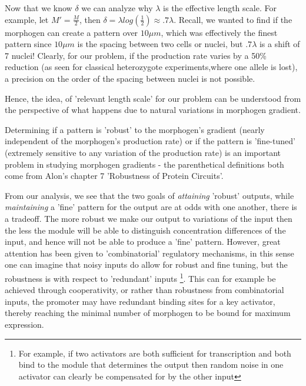   Now that we know $\delta$ we can analyze why $\lambda$ is the effective length scale.  For example, let $M' = \frac{M}{2}$, then $\delta = \lambda log(\frac{1}{2}) \approx .7 \lambda $.  Recall, we wanted to find if the morphogen can create a pattern over $10 \mu m$, which was effectively the finest pattern since  $10 \mu m$ is the spacing between two cells or nuclei, but $.7 \lambda $ is a shift of 7 nuclei!  Clearly, for our problem, if the production rate varies by a 50\% reduction (as seen for classical heterozygote experiments,where one allele is lost), a precision on the order of the spacing between nuclei is not possible.


    Hence, the idea, of 'relevant length scale' for our problem can be understood from the perspective of what happens due to natural variations in morphogen gradient.

\par
Determining if a pattern is 'robust' to the morphogen's gradient (nearly independent of the morphogen's production rate) or if the pattern is 'fine-tuned' (extremely sensitive to any variation of the production rate) is an important problem in studying morphogen gradients - the parenthetical definitions both come from Alon's chapter 7 'Robustness of Protein Circuits'.

From our analysis, we see that the two goals of \textit{attaining} 'robust' outputs, while \textit{maintaining} a 'fine' pattern for the output are at odds with one another, there is a tradeoff.  The more robust we make our output to variations of the input then the less the module will be able to distinguish concentration differences of the input, and hence will not be able to produce a 'fine' pattern.  However, great attention has been given to 'combinatorial' regulatory mechanisms, in this sense one can imagine that noisy inputs do allow for robust and fine tuning, but the robustness is with respect to 'redundant' inputs \footnote[1]{For example, if two activators are both sufficient for transcription and both bind to the module that determines the output then random noise in one activator can clearly be compensated for by the other input}.  This can for example be achieved through cooperativity, or rather than robustness from combinatorial inputs, the promoter may have redundant binding sites for a key activator, thereby reaching the minimal number of morphogen to be bound for maximum expression.


